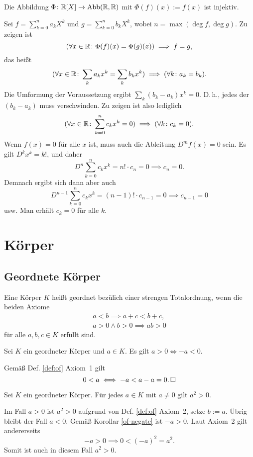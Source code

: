 \begin{Satz}
Die Abbildung $\Phi\colon\mathbb R[X]\to\operatorname{Abb}(\mathbb R,\mathbb R)$ mit $\Phi(f)(x):=f(x)$
ist injektiv.
\end{Satz}
\begin{Beweis} Sei $f=\sum_{k=0}^n a_k X^k$
und $g=\sum_{k=0}^n b_k X^k$, wobei $n=\max(\deg f,\deg g)$.
Zu zeigen ist
\[(\forall x\in\mathbb R\colon \Phi(f)(x)=\Phi(g)(x))\implies f=g,\]
das heißt
\[(\forall x\in\mathbb R\colon \sum_k a_k x^k = \sum_k b_k x^k)\implies (\forall k\colon a_k=b_k).\]
Die Umformung der Voraussetzung ergibt $\sum_k (b_k-a_k)x^k = 0$.
D.\,h., jedes der $(b_k-a_k)$ muss verschwinden. Zu zeigen ist also
lediglich
\[(\forall x\in\mathbb R\colon \sum_{k=0}^n c_k x^k = 0)\implies (\forall k\colon c_k=0).\]
Wenn $f(x)=0$ für alle $x$ ist, muss auch die Ableitung $D^m f(x)=0$
sein. Es gilt $D^k x^k = k!$, und daher
\[D^n\sum_{k=0}^n c_k x^k = n!\cdot c_n = 0 \implies c_n=0.\]
Demnach ergibt sich dann aber auch
\[D^{n-1}\sum_{k=0}^n c_k x^k = (n-1)!\cdot c_{n-1} = 0\implies c_{n-1}=0\]
usw. Man erhält $c_k=0$ für alle $k$.\;\qedsymbol
\end{Beweis}

\section{Körper}

\subsection{Geordnete Körper}

\begin{Definition}\label{def:of}
Eine Körper $K$ heißt geordnet bezülich einer strengen Totalordnung,
wenn die beiden Axiome
\begin{gather*}
a<b \implies a+c<b+c,\\
a>0\land b>0\implies ab>0
\end{gather*}
für alle $a,b,c\in K$ erfüllt sind.
\end{Definition}

\begin{Korollar}\label{of-negate}
Sei $K$ ein geordneter Körper und $a\in K$. Es gilt $a>0\iff -a<0$. 
\end{Korollar}
\begin{Beweis}
Gemäß Def. \ref{def:of} Axiom~1 gilt%
\[0<a \iff -a < a-a = 0.\,\square\]
\end{Beweis}

\begin{Korollar}\label{of-sq-positive}
Sei $K$ ein geordneter Körper. Für jedes $a\in K$ mit $a\ne 0$ gilt
$a^2>0$.
\end{Korollar}
\begin{Beweis}
Im Fall $a>0$ ist $a^2>0$ aufgrund von Def. \ref{def:of} Axiom~2, setze
$b:=a$.
Übrig bleibt der Fall $a<0$. Gemäß Korollar \ref{of-negate} ist
$-a>0$. Laut Axiom~2 gilt andererseits%
\[-a > 0 \implies 0 < (-a)^2 = a^2.\]
Somit ist auch in diesem Fall $a^2>0$.\,\qedsymbol
\end{Beweis}

